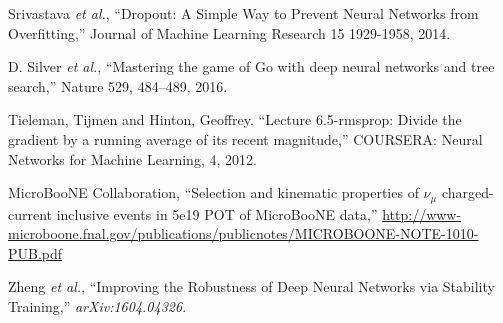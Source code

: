 \documentclass[11pt,a4paper]{article}
\begin{document}
\begin{thebibliography}{9}
  Srivastava  {\it et al.}, ``Dropout: A Simple Way to Prevent Neural Networks from Overfitting,'' Journal of Machine Learning Research 15 1929-1958, 2014.

D. Silver {\it et al.}, ``Mastering the game of Go with deep neural networks and tree search,'' Nature 529, 484–489, 2016.

Tieleman, Tijmen and Hinton, Geoffrey. ``Lecture 6.5-rmsprop: Divide the gradient by a running
average of its recent magnitude,'' COURSERA: Neural Networks for Machine Learning, 4, 2012.

  MicroBooNE Collaboration, ``Selection and kinematic properties of $\nu_\mu$ charged-current inclusive events in 5e19 POT of MicroBooNE data,''
  \protect\url{http://www-microboone.fnal.gov/publications/publicnotes/MICROBOONE-NOTE-1010-PUB.pdf}

  Zheng {\it et al.}, ``Improving the Robustness of Deep Neural Networks via Stability Training,'' \emph{arXiv:1604.04326}.

\end{thebibliography}
\end{document}
